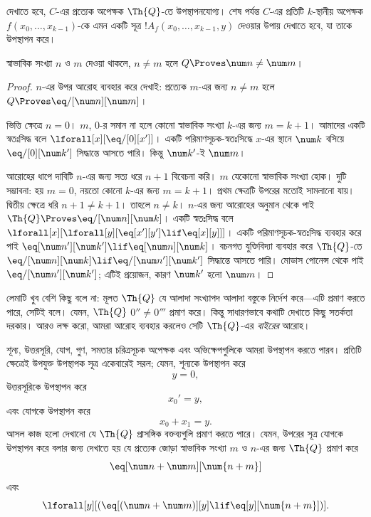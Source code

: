 \documentclass[../../../include/open-logic-section]{subfiles}
\begin{document}

দেখাতে হবে, $C$-এর প্রত্যেক অপেক্ষক $\Th{Q}$-তে উপস্থাপনযোগ্য। শেষ পর্যন্ত
$C$-এর প্রতিটি $k$-স্থানীয় অপেক্ষক $f(x_0,\dots,x_{k-1})$-কে এমন একটি
সূত্র $!A_f(x_0,\dots,x_{k-1},y)$ দেওয়ার উপায় দেখাতে হবে, যা তাকে
উপস্থাপন করে।

\begin{lem}
স্বাভাবিক সংখ্যা $n$ ও $m$ দেওয়া থাকলে, $n \neq m$ হলে $Q \Proves \num
n \neq \num m$।
\end{lem}

\begin{proof}
$n$-এর উপর আরোহ ব্যবহার করে দেখাই: প্রত্যেক $m$-এর জন্য $n \neq m$ হলে
$Q \Proves \eq/[\num n][\num m]$।

ভিত্তি ক্ষেত্রে $n = 0$। $m$, $0$-র সমান না হলে কোনো স্বাভাবিক সংখ্যা
$k$-এর জন্য $m = k + 1$। আমাদের একটি স্বতঃসিদ্ধ বলে
$\lforall[x][\eq/[0][x']]$। একটি পরিমাণসূচক-স্বতঃসিদ্ধে $x$-এর স্থানে
  $\num k$ বসিয়ে $\eq/[0][\num k']$ সিদ্ধান্তে আসতে পারি। কিন্তু
  $\num k'$-ই $\num m$।

আরোহের ধাপে দাবিটি $n$-এর জন্য সত্য ধরে $n+1$ বিবেচনা করি। $m$ যেকোনো
স্বাভাবিক সংখ্যা হোক। দুটি সম্ভাবনা: হয় $m = 0$, নয়তো কোনো $k$-এর জন্য
$m = k+1$। প্রথম ক্ষেত্রটি উপরের মতোই সামলানো যায়। দ্বিতীয় ক্ষেত্রে ধরি
$n+1 \neq k+1$। তাহলে $n \neq k$। $n$-এর জন্য আরোহের অনুমান থেকে পাই
$\Th{Q} \Proves \eq/[\num n][\num k]$। একটি স্বতঃসিদ্ধ বলে
$\lforall[x][\lforall[y][\eq[x'][y'] \lif \eq[x][y]]]$। একটি
পরিমাণসূচক-স্বতঃসিদ্ধ ব্যবহার করে পাই $\eq[\num n'][\num k'] \lif
\eq[\num n][\num k]$। বচনগত যুক্তিবিদ্যা ব্যবহার করে $\Th{Q}$-তে
$\eq/[\num n][\num k] \lif \eq/[\num n'][\num k']$ সিদ্ধান্তে আসতে
পারি। মোডাস পোনেন্স থেকে পাই $\eq/[\num n'][\num k']$; এটিই প্রয়োজন,
কারণ $\num k'$ হলো $\num m$।
\end{proof}

লেমাটি খুব বেশি কিছু বলে না: মূলত $\Th{Q}$ যে আলাদা সংখ্যাপদ আলাদা
বস্তুকে নির্দেশ করে—এটি প্রমাণ করতে পারে, সেটিই বলে। যেমন, $\Th{Q}$
$0'' \neq 0'''$ প্রমাণ করে। কিন্তু সাধারণভাবে কথাটি দেখাতে কিছু
সতর্কতা দরকার। আরও লক্ষ করো, আমরা আরোহ ব্যবহার করলেও সেটি
$\Th{Q}$-এর \emph{বাইরের} আরোহ।

শূন্য, উত্তরসূরি, যোগ, গুণ, সমতার চরিত্রসূচক অপেক্ষক এবং অভিক্ষেপগুলিকে
আমরা উপস্থাপন করতে পারব। প্রতিটি ক্ষেত্রেই উপযুক্ত উপস্থাপক সূত্র
একেবারেই সরল; যেমন, শূন্যকে উপস্থাপন করে
\[
y = 0,
\]
উত্তরসূরিকে উপস্থাপন করে
\[
x_0' = y,
\]
এবং যোগকে উপস্থাপন করে
\[
x_0 + x_1 = y.
\]
আসল কাজ হলো দেখানো যে $\Th{Q}$ প্রাসঙ্গিক বক্তব্যগুলি প্রমাণ করতে পারে।
যেমন, উপরের সূত্র যোগকে উপস্থাপন করে বলার জন্য দেখাতে হয় যে প্রত্যেক জোড়া
স্বাভাবিক সংখ্যা $m$ ও $n$-এর জন্য $\Th{Q}$ প্রমাণ করে
\[
\eq[\num n + \num m][\num {n+m}]
\]
এবং
\[
\lforall[y][(\eq[(\num n + \num m)][y] \lif \eq[y][\num {n+m}])].
\]
\end{document}
